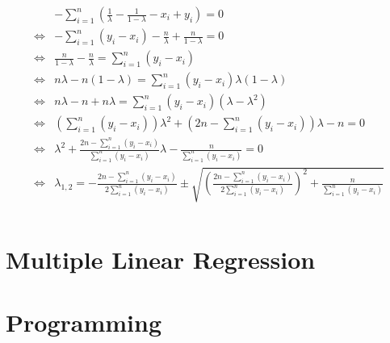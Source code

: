 \documentclass{article}
\begin{document}
\begin{align}
\begin{aligned}
& - \sum_{i=1}^{n} ( \frac{1}{\lambda} - \frac{1}{1- \lambda} - x_i + y_i) = 0 \\
\Leftrightarrow & - \sum_{i=1}^{n}( y_i - x_i)  - \frac{n}{\lambda} + \frac{n}{1-\lambda} = 0\\
\Leftrightarrow & \frac{n}{1-\lambda}  - \frac{n}{\lambda} = \sum_{i=1}^{n}( y_i - x_i)\\
\Leftrightarrow & n \lambda -n(1-\lambda) = \sum_{i=1}^{n}( y_i - x_i) \lambda (1 - \lambda)\\
\Leftrightarrow & n \lambda -n + n\lambda = \sum_{i=1}^{n}( y_i - x_i) (\lambda - \lambda^2)\\
\Leftrightarrow & (\sum_{i=1}^{n}( y_i - x_i)) \lambda^2 + (2n - \sum_{i=1}^{n}( y_i - x_i))\lambda - n = 0\\
\Leftrightarrow & \lambda^2 + \frac{2n - \sum_{i=1}^{n}( y_i - x_i)}{\sum_{i=1}^{n}( y_i - x_i)}\lambda - \frac{n}{\sum_{i=1}^{n}( y_i - x_i)} = 0\\
\Leftrightarrow & \lambda_{1,2} = - \frac{2n - \sum_{i=1}^{n}( y_i - x_i)}{2 \sum_{i=1}^{n}( y_i - x_i)}\pm \sqrt{(\frac{2n - \sum_{i=1}^{n}( y_i - x_i)}{2 \sum_{i=1}^{n}( y_i - x_i)})^2 +\frac{n}{\sum_{i=1}^{n}( y_i - x_i)}} \\
\end{aligned}
\end{align}

 

\section{Multiple Linear Regression}


\section{Programming}


%

%

\end{document}
